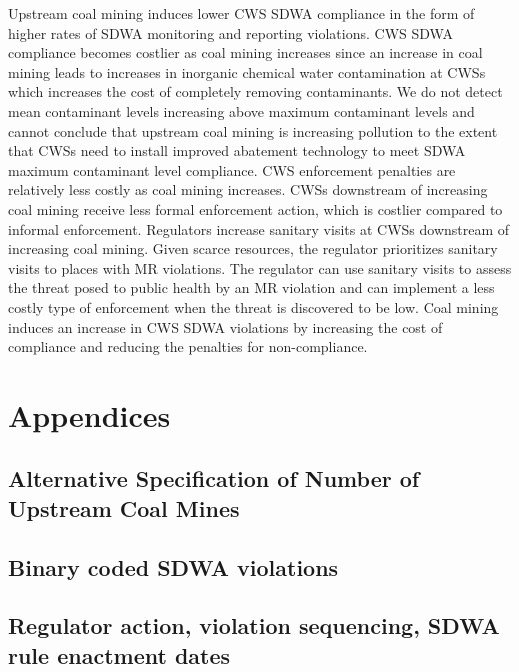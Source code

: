 \documentclass{article}
\begin{document}
Upstream coal mining induces lower CWS SDWA compliance in the form of higher rates of SDWA monitoring and reporting violations. CWS SDWA compliance becomes costlier as coal mining increases since an increase in coal mining leads to increases in inorganic chemical water contamination at CWSs which increases the cost of completely removing contaminants. We do not detect mean contaminant levels increasing above maximum contaminant levels and cannot conclude that upstream coal mining is increasing pollution to the extent that CWSs need to install improved abatement technology to meet SDWA maximum contaminant level compliance. CWS enforcement penalties are relatively less costly as coal mining increases. CWSs downstream of increasing coal mining receive less formal enforcement action, which is costlier compared to informal enforcement. Regulators increase sanitary visits at CWSs downstream of increasing coal mining. Given scarce resources, the regulator prioritizes sanitary visits to places with MR violations. The regulator can use sanitary visits to assess the threat posed to public health by an MR violation and can implement a less costly type of enforcement when the threat is discovered to be low. Coal mining induces an increase in CWS SDWA violations by increasing the cost of compliance and reducing the penalties for non-compliance.

\newpage

\section{Appendices}

\subsection{Alternative Specification of Number of Upstream Coal Mines}







\subsection{Binary coded SDWA violations}







\subsection{Regulator action, violation sequencing, SDWA rule enactment dates}











\printbibliography
\end{document}
